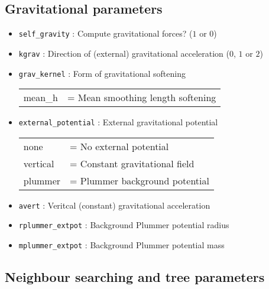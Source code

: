 \documentclass[a4paper]{article}
\newcommand{\var}[1]{\texttt{#1}}
\begin{document}
\subsection{Gravitational parameters}

\begin{itemize}

\item \var{self\_gravity} : Compute gravitational forces?   ($1$ or $0$)

\item \var{kgrav} : Direction of (external) gravitational acceleration ($0$, $1$ or $2$)

\item \var{grav\_kernel} : Form of gravitational softening \\
\begin{tabular}{ll}
mean\_h   & = Mean smoothing length softening
\end{tabular}

\item \var{external\_potential} : External gravitational potential \\
\begin{tabular}{ll}
none     & = No external potential \\
vertical & = Constant gravitational field \\
plummer  & = Plummer background potential
\end{tabular}

\item \var{avert} : Veritcal (constant) gravitational acceleration

\item \var{rplummer\_extpot} : Background Plummer potential radius

\item \var{mplummer\_extpot} : Background Plummer potential mass

\end{itemize}



\subsection{Neighbour searching and tree parameters}
\end{document}
